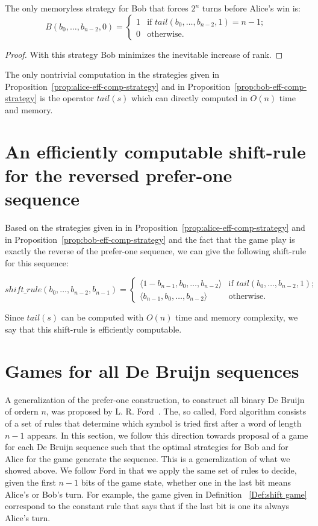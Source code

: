 \documentclass[final,12pt]{elsarticle}
\theoremstyle{definition} \newtheorem{definition}[theorem]{Definition} \newtheorem{observation}[theorem]{Observation} \newtheorem{example}[theorem]{Example} \newtheorem{remark}[theorem]{Remark} \newtheorem{corrolary}[theorem]{Corrolary}
\newcommand{\T}[1]{\langle{#1}\rangle} \DeclareMathOperator{\drop}{drop} \DeclareMathOperator{\dropbits}{drop\_bits} \DeclareMathOperator{\dropstates}{drop\_states} \DeclareMathOperator{\leadingForm}{LeadingForm} \DeclareMathOperator{\dv}{div} %
\begin{document}
\begin{proposition}
	The only memoryless strategy for Bob that forces $2^n$ turns before Alice's win is:
	$$B(b_0,\dots,b_{n-2},0) =
	\begin{cases}
	1 &
	\text{if } tail(b_0,\dots,b_{n-2},1)=n-1; \\
	0 &
	\text{otherwise.}
	\end{cases} $$
	\label{prop:bob-eff-comp-strategy}
\end{proposition}
\begin{proof}
	With this strategy Bob minimizes the inevitable increase of rank. 
\end{proof}

The only nontrivial computation in the strategies given in Proposition~\ref{prop:alice-eff-comp-strategy} and in Proposition~\ref{prop:bob-eff-comp-strategy} is the operator $tail(s)$ which can directly computed in $O(n)$ time and memory. 

\section{An efficiently computable shift-rule for the reversed prefer-one sequence}
\label{sec:efficient-shift-rule}
Based on the strategies given in  in Proposition~\ref{prop:alice-eff-comp-strategy} and in Proposition~\ref{prop:bob-eff-comp-strategy} and the fact that the game play is exactly the reverse of the prefer-one sequence, we can give the following shift-rule for this sequence:

$$shift\_rule(b_0,\dots,b_{n-2},b_{n-1})=\begin{cases}
	\T{1-b_{n-1},b_0,\dots,b_{n-2}} & \text{if } tail(b_0,\dots,b_{n-2},1); \\
	\T{b_{n-1},b_0,\dots,b_{n-2}} & \text{otherwise.}
\end{cases}$$

Since $tail(s)$ can be computed with $O(n)$ time and memory complexity, we say that this shift-rule is efficiently computable.

\section{Games for all De Bruijn sequences} 
\label{sec:games-for-all-DB-seq}

A generalization of the prefer-one construction, to construct all binary De Bruijn of ordern $n$, was proposed by L. R. Ford~\cite{ford1957cyclic}. The, so called, Ford algorithm consists of a set of rules that determine which symbol is tried first after a word of length $n-1$ appears. In this section, we follow this direction towards proposal of a game for each De Bruijn sequence such that the optimal strategies for Bob and for Alice for the game generate the sequence. This is a generalization of what we showed above. We follow Ford in that we apply the same set of rules to decide, given the first $n-1$ bits of the game state, whether one in the last bit means Alice's or Bob's turn. For example, the game given in Definition~   \ref{Def:shift game} correspond to the constant rule that says that if the last bit is one its always Alice's turn.
\end{document}
